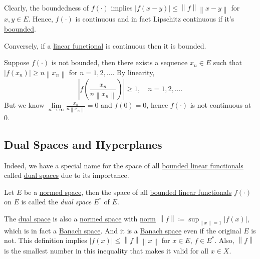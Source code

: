 Clearly, the boundedness of \(f(\cdot)\) implies \(\left\vert f(x-y) \right\vert \leq \left\lVert f\right\rVert \left\lVert x-y\right\rVert \) for \(x, y\in E\). Hence, \(f(\cdot)\) is continuous and in fact Lipschitz continuous if it's \hyperref[def:bounded-linear-functional]{boounded}.

\begin{remark}
	Conversely, if a \hyperref[def:linear-functional]{linear functional} is continuous then it is bounded.
\end{remark}
\begin{explanation}
	Suppose \(f(\cdot)\) is not bounded, then there exists a sequence \(x_n\in E\) such that \(\left\vert f(x_n) \right\vert \geq n \left\lVert x_n\right\rVert \) for \(n = 1, 2, \ldots  \). By linearity,
	\[
		\left\vert f \left( \frac{x_{n} }{n \left\lVert x_{n} \right\rVert } \right) \right\vert \geq 1, \quad n = 1, 2, \ldots.
	\]
	But we know \(\lim\limits_{n \to \infty} \frac{x_{n} }{n \left\lVert x_{n} \right\rVert }=0\) and \(f(0) = 0\), hence \(f(\cdot)\) is not continuous at \(0\).
\end{explanation}

\subsection{Dual Spaces and Hyperplanes}
Indeed, we have a special name for the space of all \hyperref[def:bounded-linear-functional]{bounded linear functionals} called \hyperref[def:dual-space]{dual spaces} due to its importance.

\begin{definition}\label{def:dual-space}
	Let \(E\) be a \hyperref[def:normed-vector-space]{normed space}, then the space of all \hyperref[def:bounded-linear-functional]{bounded linear functionals} \(f(\cdot)\) on \(E\) is called the \emph{dual space} \(E^{\ast} \) of \(E\).
\end{definition}
The \hyperref[def:dual-space]{dual space} is also a \hyperref[def:normed-vector-space]{normed space} with \hyperref[def:norm]{norm} \(\left\lVert f\right\rVert \coloneqq \sup _{\left\lVert x\right\rVert = 1}\left\vert f(x) \right\vert \), which is in fact a \hyperref[def:Banach-space]{Banach space}. And it is a \hyperref[def:Banach-space]{Banach space} even if the original \(E\) is not. This definition implies \(\left\vert f(x) \right\vert \leq \left\lVert f\right\rVert \left\lVert x\right\rVert \) for \(x\in E\), \(f\in E^{\ast} \). Also, \(\left\lVert f\right\rVert \) is the smallest number in this inequality that makes it valid for all \(x\in X\).

